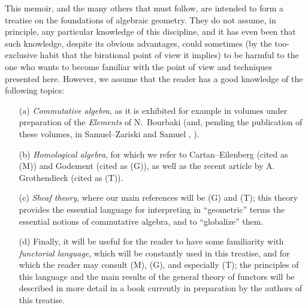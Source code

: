 This memoir, and the many others that must follow, are intended to form a
treatise on the foundations of algebraic geometry. They do not assume, in
principle, any particular knowledge of this discipline, and it has even been
that such knowledge, despite its obvious advantages, could sometimes (by the
too-exclusive habit that the birational point of view it implies) to be harmful
to the one who wants to become familiar with the point of view and techniques
presented here. However, we assume that the reader has a good knowledge of the
following topics:
\begin{itemize}
  \item[(a)] {\it Commutative algebra}, as it is exhibited for example in
            volumes under preparation of the {\it Elements} of N.~Bourbaki
            (and, pending the publication of these volumes, in Samuel--Zariski
            \cite{I-13} and Samuel \cite{I-11}, \cite{I-12}).
  \item[(b)] {\it Homological algebra}, for which we refer to Cartan--Eilenberg
             \cite{I-2} (cited as (M)) and Godement \cite{I-4} (cited as (G)), as well
             as the recent article by A. Grothendieck \cite{I-6} (cited as (T)).
  \item[(c)] {\it Sheaf theory}, where our main references will be (G) and (T);
             this theory provides the essential language for interpreting in
             ``geometric'' terms the essential notions of commutative algebra,
             and to ``globalize'' them.
  \item[(d)] Finally, it will be useful for the reader to have some familiarity with
             {\it functorial language}, which will be constantly used in this
             treatise, and for which the reader may consult (M), (G), and especially
             (T); the principles of this language and the main results of the general
             theory of functors will be described in more detail in a book currently
             in preparation by the authors of this treatise.
\end{itemize}

\sectionbreak

